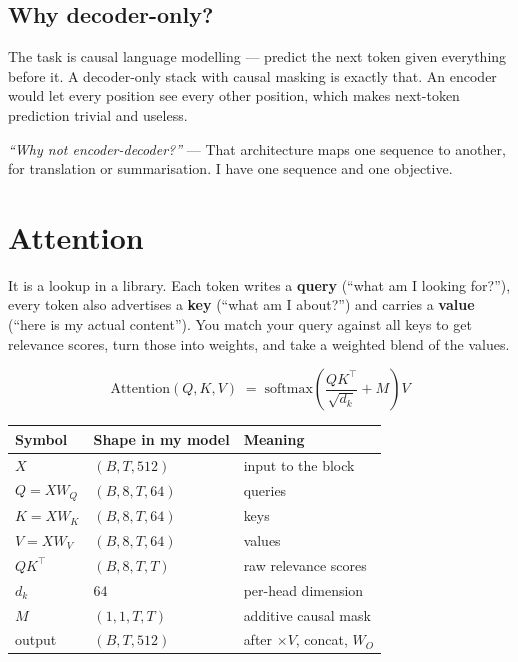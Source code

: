 \documentclass[11pt]{report}
\begin{document}
\subsection{Why decoder-only?}

\begin{shortans}
The task is causal language modelling --- predict the next token given
everything before it. A decoder-only stack with causal masking is exactly that.
An encoder would let every position see every other position, which makes
next-token prediction trivial and useless.
\end{shortans}

\begin{notebox}
\textit{``Why not encoder-decoder?''} --- That architecture maps one sequence to
another, for translation or summarisation. I have one sequence and one
objective.
\end{notebox}

\section{Attention}

\begin{notebox}
It is a lookup in a library. Each token writes a \textbf{query} (``what am I
looking for?''), every token also advertises a \textbf{key} (``what am I
about?'') and carries a \textbf{value} (``here is my actual content''). You
match your query against all keys to get relevance scores, turn those into
weights, and take a weighted blend of the values.
\end{notebox}

\[
\mathrm{Attention}(Q,K,V) \;=\;
\mathrm{softmax}\!\left(\frac{QK^{\top}}{\sqrt{d_k}} + M\right) V
\]

\begin{center}\small
\begin{tabular}{llp{5.4cm}}
\toprule
\textbf{Symbol} & \textbf{Shape in my model} & \textbf{Meaning} \\
\midrule
$X$ & $(B, T, 512)$ & input to the block \\
$Q = XW_Q$ & $(B, 8, T, 64)$ & queries \\
$K = XW_K$ & $(B, 8, T, 64)$ & keys \\
$V = XW_V$ & $(B, 8, T, 64)$ & values \\
$QK^{\top}$ & $(B, 8, T, T)$ & raw relevance scores \\
$d_k$ & $64$ & per-head dimension \\
$M$ & $(1, 1, T, T)$ & additive causal mask \\
output & $(B, T, 512)$ & after $\times V$, concat, $W_O$ \\
\bottomrule
\end{tabular}
\end{center}
\end{document}
